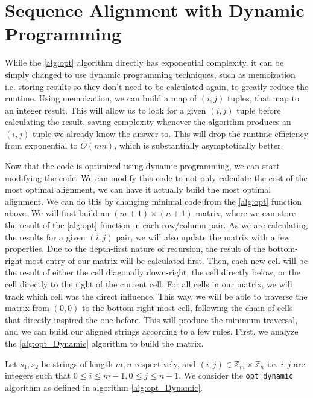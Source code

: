 \documentclass{article}
\renewcommand{\_}{\ifincsname_\else\legacyunderscore\fi}
\begin{document}
\pagebreak
    \section*{Sequence Alignment with Dynamic Programming}

        While the \ref{alg:opt} algorithm directly has exponential complexity, it can be simply changed to use dynamic programming techniques, such as memoization i.e. storing results so they don't need to be calculated again, to greatly reduce the runtime. Using memoization, we can build a map of $(i, j)$ tuples, that map to an integer result. This will allow us to look for a given $(i, j)$ tuple before calculating the result, saving complexity whenever the algorithm produces an $(i, j)$ tuple we already know the answer to. This will drop the runtime efficiency from exponential to $O(mn)$, which is substantially asymptotically better. 

	Now that the code is optimized using dynamic programming, we can start modifying the code. We can modify this code to not only calculate the cost of the most optimal alignment, we can have it actually build the most optimal alignment. We can do this by changing minimal code from the \ref{alg:opt} function above. We will first build an $(m+1)\times (n+1)$ matrix, where we can store the result of the \ref{alg:opt} function in each row/column pair. As we are calculating the results for a given $(i, j)$ pair, we will also update the matrix with a few properties. Due to the depth-first nature of recursion, the result of the bottom-right most entry of our matrix will be calculated first. Then, each new cell will be the result of either the cell diagonally down-right, the cell directly below, or the cell directly to the right of the current cell. For all cells in our matrix, we will track which cell was the direct influence. This way, we will be able to traverse the matrix from $(0, 0)$ to the bottom-right most cell, following the chain of cells that directly inspired the one before. This will produce the minimum traversal, and we can build our aligned strings according to a few rules. First, we analyze the \ref{alg:opt_Dynamic} algorithm to build the matrix. 

        Let $s_1, s_2$ be strings of length $m, n$ respectively, and $(i, j) \in \mathbb{Z}_m \times \mathbb{Z}_n$ i.e. $i, j$ are integers such that $0 \leq i \leq m - 1, 0 \leq j \leq n - 1$.  We consider the \texttt{opt\_dynamic} algorithm as defined in algorithm \ref{alg:opt_Dynamic}.
\end{document}
